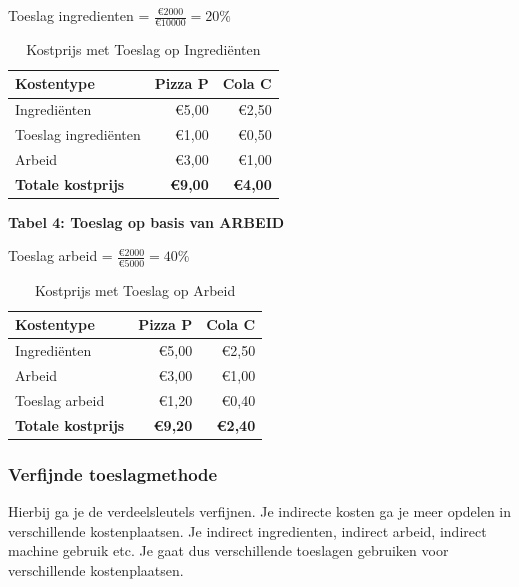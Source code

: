 \documentclass[a4paper,11pt]{article}
\begin{document}
Toeslag ingredienten = $\frac{\text{€}2000}{\text{€}10000} = 20\%$
\newline

\begin{table}[ht]
    \centering
    \begin{tabular}{|l|r|r|}
        \hline
        \textbf{Kostentype} & \textbf{Pizza P} & \textbf{Cola C} \\
        \hline
        Ingrediënten & €5,00 & €2,50 \\
        Toeslag ingrediënten  & €1,00 & €0,50 \\
        Arbeid & €3,00 & €1,00 \\
        \hline
        \textbf{Totale kostprijs} & \textbf{€9,00} & \textbf{€4,00} \\
        \hline
    \end{tabular}
    \caption{Kostprijs met Toeslag op Ingrediënten}
\end{table}

\textbf{Tabel 4: Toeslag op basis van ARBEID}

Toeslag arbeid = $\frac{\text{€}2000}{\text{€}5000} = 40\%$

\begin{table}[ht]
    \centering
    \begin{tabular}{|l|r|r|}
        \hline
        \textbf{Kostentype} & \textbf{Pizza P} & \textbf{Cola C} \\
        \hline
        Ingrediënten & €5,00 & €2,50 \\
        Arbeid & €3,00 & €1,00 \\
        Toeslag arbeid  & €1,20 & €0,40 \\
        \hline
        \textbf{Totale kostprijs} & \textbf{€9,20} & \textbf{€2,40} \\
        \hline
    \end{tabular}
    \caption{Kostprijs met Toeslag op Arbeid}
\end{table}

\subsubsection{Verfijnde toeslagmethode}
Hierbij ga je de verdeelsleutels verfijnen.
Je indirecte kosten ga je meer opdelen in verschillende kostenplaatsen.
Je indirect ingredienten, indirect arbeid, indirect machine gebruik etc.
Je gaat dus verschillende toeslagen gebruiken voor verschillende kostenplaatsen.
\newline 
\end{document}
